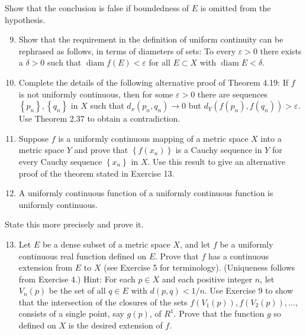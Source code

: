 \documentclass[10pt]{article}
\begin{document}
Show that the conclusion is false if boundedness of $E$ is omitted from the hypothesis.

\begin{enumerate}
  \setcounter{enumi}{8}
  \item Show that the requirement in the definition of uniform continuity can be rephrased as follows, in terms of diameters of sets: To every $\varepsilon>0$ there exists a $\delta>0$ such that $\operatorname{diam} f(E)<\varepsilon$ for all $E \subset X$ with $\operatorname{diam} E<\delta$.

  \item Complete the details of the following alternative proof of Theorem 4.19: If $f$ is not uniformly continuous, then for some $\varepsilon>0$ there are sequences $\left\{p_{n}\right\},\left\{q_{n}\right\}$ in $X$ such that $d_{x}\left(p_{n}, q_{n}\right) \rightarrow 0$ but $d_{Y}\left(f\left(p_{n}\right), f\left(q_{n}\right)\right)>\varepsilon$. Use Theorem 2.37 to obtain a contradiction.

  \item Suppose $f$ is a uniformly continuous mapping of a metric space $X$ into a metric space $Y$ and prove that $\left\{f\left(x_{n}\right)\right\}$ is a Cauchy sequence in $Y$ for every Cauchy sequence $\left\{x_{n}\right\}$ in $X$. Use this result to give an alternative proof of the theorem stated in Exercise 13.

  \item A uniformly continuous function of a uniformly continuous function is uniformly continuous.

\end{enumerate}

State this more precisely and prove it.

\begin{enumerate}
  \setcounter{enumi}{12}
  \item Let $E$ be a dense subset of a metric space $X$, and let $f$ be a uniformly continuous real function defined on $E$. Prove that $f$ has a continuous extension from $E$ to $X$ (see Exercise 5 for terminology). (Uniqueness follows from Exercise 4.) Hint: For each $p \in X$ and each positive integer $n$, let $V_{n}(p)$ be the set of all $q \in E$ with $d(p, q)<1 / n$. Use Exercise 9 to show that the intersection of the closures of the sets $f\left(V_{1}(p)\right), f\left(V_{2}(p)\right), \ldots$, consists of a single point, say $g(p)$, of $R^{1}$. Prove that the function $g$ so defined on $X$ is the desired extension of $f$.
\end{enumerate}
\end{document}
